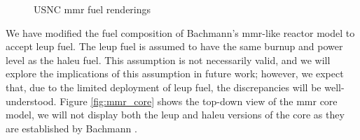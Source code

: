 \begin{figure}[!ht]
    \hfill
    \caption{
    USNC \gls{mmr} fuel renderings
      \cite{usnc_media_kit}}
    \label{fig:usnc_fuel}
\end{figure}

We have modified the fuel composition of Bachmann's \gls{mmr}-like reactor model to accept \gls{leup} fuel. The \gls{leup} fuel is assumed to have the same burnup and power level as the \gls{haleu} fuel. This assumption is not necessarily valid, and we will explore the implications of this assumption in future work; however, we expect that, due to the limited deployment of \gls{leup} fuel, the discrepancies will be well-understood. Figure \ref{fig:mmr_core} shows the top-down view of the \gls{mmr} core model, we will not display both the \gls{leup} and \gls{haleu} versions of the core as they are established by Bachmann \cite{bachmann_thesis_2023}.



